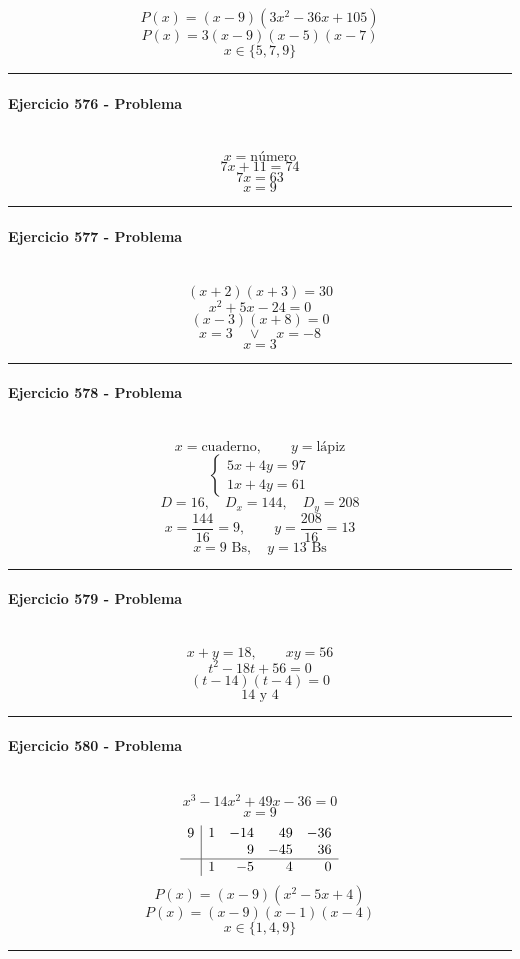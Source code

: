 \documentclass[10pt,a4paper]{article}
\newcommand{\res}[1]{\paragraph{#1}\mbox{}\\[-1.2em]}
\begin{document}
\[ P(x)=(x-9)(3 x^{2} - 36 x + 105) \]
\[ P(x)=3(x-9)(x-5)(x-7) \]
\[ \boxed{x\in\{5,7,9\}} \]
\vspace{1mm}\hrule\vspace{2mm}
\res{Ejercicio 576 - Problema}
\[ x=\text{número} \]
\[ 7x+11=74 \]
\[ 7x=63 \]
\[ \boxed{x=9} \]
\vspace{1mm}\hrule\vspace{2mm}
\res{Ejercicio 577 - Problema}
\[ (x+2)(x+3)=30 \]
\[ x^{2} + 5 x - 24=0 \]
\[ (x-3)(x+8)=0 \]
\[ x=3\quad \vee \quad x=-8 \]
\[ \boxed{x=3} \]
\vspace{1mm}\hrule\vspace{2mm}
\res{Ejercicio 578 - Problema}
\[ x=\text{cuaderno},\qquad y=\text{lápiz} \]
\[ \begin{cases}5x+4y=97\\1x+4y=61\end{cases} \]
\[ D=16,\quad D_x=144,\quad D_y=208 \]
\[ x=\frac{144}{16}=9,\qquad y=\frac{208}{16}=13 \]
\[ \boxed{x=9\text{ Bs},\quad y=13\text{ Bs}} \]
\vspace{1mm}\hrule\vspace{2mm}
\res{Ejercicio 579 - Problema}
\[ x+y=18,\qquad xy=56 \]
\[ t^2-18t+56=0 \]
\[ (t-14)(t-4)=0 \]
\[ \boxed{14\text{ y }4} \]
\vspace{1mm}\hrule\vspace{2mm}
\res{Ejercicio 580 - Problema}
\[ x^{3} - 14 x^{2} + 49 x - 36=0 \]
\[ x=9 \]
\[\begin{array}{r|rrrr}9 & 1 & -14 & 49 & -36\\  &  & 9 & -45 & 36\\\hline  & 1 & -5 & 4 & 0\end{array}\]
\[ P(x)=(x-9)(x^{2} - 5 x + 4) \]
\[ P(x)=(x-9)(x-1)(x-4) \]
\[ \boxed{x\in\{1,4,9\}} \]
\vspace{1mm}\hrule\vspace{2mm}
\end{document}
